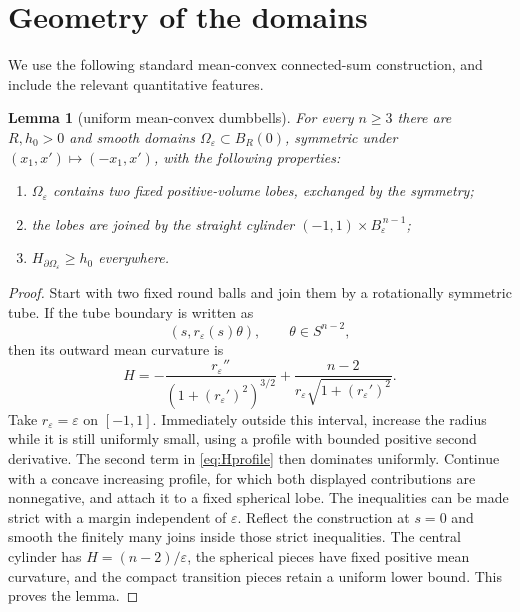 \documentclass[11pt]{article}
\newtheorem{lemma}{Lemma}
\begin{document}
\section{Geometry of the domains}

We use the following standard mean-convex connected-sum construction, and
include the relevant quantitative features.

\begin{lemma}[uniform mean-convex dumbbells]\label{lem:dumbbell}
For every $n\geq3$ there are $R,h_0>0$ and smooth domains
$\Omega_\varepsilon\subset B_R(0)$, symmetric under
$(x_1,x')\mapsto(-x_1,x')$, with the following properties:
\begin{enumerate}
\item $\Omega_\varepsilon$ contains two fixed positive-volume lobes, exchanged
by the symmetry;
\item the lobes are joined by the straight cylinder
$(-1,1)\times B_{\varepsilon}^{\,n-1}$;
\item $H_{\partial\Omega_\varepsilon}\geq h_0$ everywhere.
\end{enumerate}
\end{lemma}

\begin{proof}
Start with two fixed round balls and join them by a rotationally symmetric
tube.  If the tube boundary is written as
\[
 (s,r_\varepsilon(s)\theta),\qquad \theta\in S^{n-2},
\]
then its outward mean curvature is
\begin{equation}\label{eq:Hprofile}
 H=-\frac{r_\varepsilon''}{(1+(r_\varepsilon')^2)^{3/2}}
   +\frac{n-2}{r_\varepsilon\sqrt{1+(r_\varepsilon')^2}}.
\end{equation}
Take $r_\varepsilon=\varepsilon$ on $[-1,1]$.  Immediately outside
this interval, increase the radius while it is still uniformly small, using a
profile with bounded positive second derivative.  The second term in
\eqref{eq:Hprofile} then dominates uniformly.  Continue with a concave
increasing profile, for which both displayed contributions are nonnegative,
and attach it to a fixed spherical lobe.  The inequalities can be made
strict with a margin independent of $\varepsilon$.  Reflect the construction
at $s=0$ and smooth the finitely many joins inside those strict inequalities.
The central cylinder has $H=(n-2)/\varepsilon$, the spherical pieces have
fixed positive mean curvature, and the compact transition pieces retain a
uniform lower bound.  This proves the lemma.
\end{proof}
\end{document}
